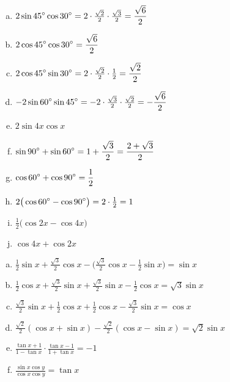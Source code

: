 \documentclass[a4paper,12pt]{letter}
\begin{document}
\begin{resitev}
\begin{enumerate}[a)]
\item $\displaystyle 2\sin45\degree\cos30\degree=2\cdot\tfrac{\sqrt2}{2}\cdot\tfrac{\sqrt3}{2}=\frac{\sqrt6}{2}$
\item $\displaystyle 2\cos45\degree\cos30\degree=\frac{\sqrt6}{2}$
\item $\displaystyle 2\cos45\degree\sin30\degree=2\cdot\tfrac{\sqrt2}{2}\cdot\tfrac12=\frac{\sqrt2}{2}$
\item $\displaystyle -2\sin60\degree\sin45\degree=-2\cdot\tfrac{\sqrt3}{2}\cdot\tfrac{\sqrt2}{2}=-\frac{\sqrt6}{2}$
\item $\displaystyle 2\sin4x\cos x$
\item $\displaystyle \sin90\degree+\sin60\degree=1+\frac{\sqrt3}{2}=\frac{2+\sqrt3}{2}$
\item $\displaystyle \cos60\degree+\cos90\degree=\frac12$
\item $\displaystyle 2\big(\cos60\degree-\cos90\degree\big)=2\cdot\tfrac12=1$
\item $\displaystyle \tfrac12\big(\cos2x-\cos4x\big)$
\item $\displaystyle \cos4x+\cos2x$
\end{enumerate}
\end{resitev}


\begin{resitev}[-- Poenostavljanje]
\begin{enumerate}[a)]
\item $\displaystyle \tfrac12\sin x+\tfrac{\sqrt3}{2}\cos x-\big(\tfrac{\sqrt3}{2}\cos x-\tfrac12\sin x\big)=\sin x$
\item $\displaystyle \tfrac12\cos x+\tfrac{\sqrt3}{2}\sin x+\tfrac{\sqrt3}{2}\sin x-\tfrac12\cos x=\sqrt3\sin x$
\item $\displaystyle \tfrac{\sqrt3}{2}\sin x+\tfrac12\cos x+\tfrac12\cos x-\tfrac{\sqrt3}{2}\sin x=\cos x$
\item $\displaystyle \tfrac{\sqrt2}{2}(\cos x+\sin x)-\tfrac{\sqrt2}{2}(\cos x-\sin x)=\sqrt2\sin x$
\item $\displaystyle \frac{\tan x+1}{1-\tan x}\cdot\frac{\tan x-1}{1+\tan x}=-1$
\item $\displaystyle \frac{\sin x\cos y}{\cos x\cos y}=\tan x$
\end{enumerate}
\end{resitev}
\end{document}
